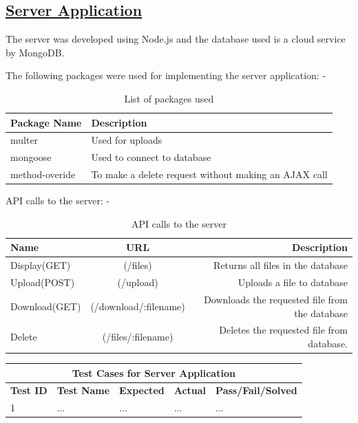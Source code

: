 \documentclass{article}
\begin{document}
\subsection{\underline{Server Application}}
The server was developed using Node.js and the database used is a cloud service by MongoDB.

The following packages were used for implementing the server application: -
\begin{table}[h!]
\begin {center}
\caption{List of packages used}
\begin{tabular}{l|l}
\hline
\textbf{Package Name} & \textbf{Description}\\
\hline
multer & Used for uploads\\
mongoose & Used to connect to database\\
method-overide & To make a delete request without making an AJAX call\\
\end{tabular}
\end{center}
\end{table}

API calls to the server: -
\begin{table}[h!]
\begin {center}
\caption{API calls to the server}
\begin{tabular}{l|c|r}
\hline
\textbf{Name} & \textbf{URL} & \textbf{Description}\\
\hline
Display(GET) & (/files) & Returns all files in the database\\
Upload(POST) & (/upload) & Uploads a file to database\\
Download(GET) & (/download/:filename) & Downloads the requested file from the database\\
Delete & (/files/:filename)  & Deletes the requested file from database.\\
\end{tabular}
\end{center}
\end{table}

\begin{tabular}{|p{2cm}|p{2cm}|p{3cm}|p{3cm}|p{3cm}|}
\hline
\multicolumn{5}{|c|}{\textbf{Test Cases for Server Application}} \\
\hline
\textbf{Test ID} & \textbf{Test Name} & \textbf{Expected} & \textbf{Actual} & \textbf{Pass/Fail/Solved} \\
\hline
1 & ... & ... & ... & ... \\
\hline
\end{tabular}
\end{document}
